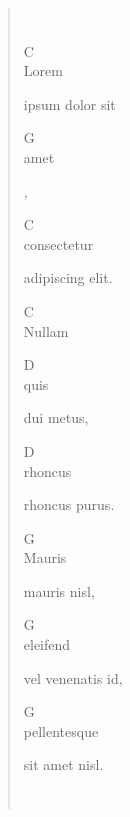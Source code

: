 \documentclass[twocolumn]{article}
\newlength{\nxword}
\newcommand{\ch}[2]{\settowidth{\nxword}{#1}\parbox[b]{\nxword}{\textsf{\large #2}\\ #1}}
\begin{document}
\begin{verse}
~\\

\ch{Lorem}{C} ipsum dolor sit \ch{amet}{G}, \\
\ch{consectetur}{C} adipiscing elit.\\
\ch{Nullam}{C} \ch{quis}{D} dui metus, \\
\ch{rhoncus}{D} rhoncus purus. \\
\ch{Mauris}{G} mauris nisl, \\
\ch{eleifend}{G} vel venenatis id, \\
\ch{pellentesque}{G} sit amet nisl.

~\\

\end{verse}
\end{document}
